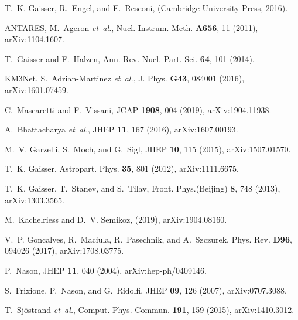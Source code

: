 \documentclass[a4paper,11pt]{article}
\begin{document}
\begin{thebibliography}{99}
T.~K. Gaisser, R.~Engel, and E.~Resconi,
 (Cambridge University Press,
  2016).

ANTARES, M.~Ageron {\em et~al.},
\newblock Nucl. Instrum. Meth. {\bf A656}, 11 (2011), arXiv:1104.1607.

T.~Gaisser and F.~Halzen,
\newblock Ann. Rev. Nucl. Part. Sci. {\bf 64}, 101 (2014).

KM3Net, S.~Adrian-Martinez {\em et~al.},
\newblock J. Phys. {\bf G43}, 084001 (2016), arXiv:1601.07459.

C.~Mascaretti and F.~Vissani,
\newblock JCAP {\bf 1908}, 004 (2019), arXiv:1904.11938.

A.~Bhattacharya {\em et~al.},
\newblock JHEP {\bf 11}, 167 (2016), arXiv:1607.00193.

M.~V. Garzelli, S.~Moch, and G.~Sigl,
\newblock JHEP {\bf 10}, 115 (2015), arXiv:1507.01570.

T.~K. Gaisser,
\newblock Astropart. Phys. {\bf 35}, 801 (2012), arXiv:1111.6675.

T.~K. Gaisser, T.~Stanev, and S.~Tilav,
\newblock Front. Phys.(Beijing) {\bf 8}, 748 (2013), arXiv:1303.3565.

M.~Kachelriess and D.~V. Semikoz,
\newblock (2019), arXiv:1904.08160.

V.~P. Goncalves, R.~Maciula, R.~Pasechnik, and A.~Szczurek,
\newblock Phys. Rev. {\bf D96}, 094026 (2017), arXiv:1708.03775.

P.~Nason,
\newblock JHEP {\bf 11}, 040 (2004), arXiv:hep-ph/0409146.

S.~Frixione, P.~Nason, and G.~Ridolfi,
\newblock JHEP {\bf 09}, 126 (2007), arXiv:0707.3088.

T.~Sj{\"o}strand {\em et~al.},
\newblock Comput. Phys. Commun. {\bf 191}, 159 (2015), arXiv:1410.3012.


\end{thebibliography}
\end{document}
